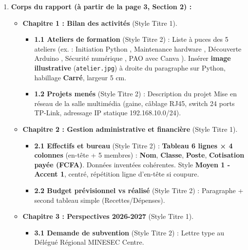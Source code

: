 \documentclass[11pt]{article}
\begin{document}
\begin{exemplebox}
\begin{enumerate}
    \begin{itemize}
        \item Inséré via \texttt{Références > Table des matières > Automatique 1}.
        \item Doit lister les titres de niveau 1 et niveau 2.
        \item Titre \og SOMMAIRE \fg{} mis en forme manuelle (Arial 16, Gras, Centré) pour ne pas apparaître dans la table.
    \end{itemize}
    \item \textbf{Corps du rapport (à partir de la page 3, Section 2) :}
    \begin{itemize}
        \item \textbf{Chapitre 1 : Bilan des activités} (Style Titre 1).
        \begin{itemize}
            \item \textbf{1.1 Ateliers de formation} (Style Titre 2) : Liste à puces des 5 ateliers (ex. : \og Initiation Python \fg{}, \og Maintenance hardware \fg{}, \og Découverte Arduino \fg{}, \og Sécurité numérique \fg{}, \og PAO avec Canva \fg{}). Insérer \textbf{image illustrative} (\texttt{atelier.jpg}) à droite du paragraphe sur Python, habillage \textbf{Carré}, largeur 5 cm.
            \item \textbf{1.2 Projets menés} (Style Titre 2) : Description du projet \og Mise en réseau de la salle multimédia \fg{} (gaine, câblage RJ45, switch 24 ports TP-Link, adressage IP statique 192.168.10.0/24).
        \end{itemize}
        \item \textbf{Chapitre 2 : Gestion administrative et financière} (Style Titre 1).
        \begin{itemize}
            \item \textbf{2.1 Effectifs et bureau} (Style Titre 2) : \textbf{Tableau 6 lignes × 4 colonnes} (en-tête + 5 membres) : \textbf{Nom}, \textbf{Classe}, \textbf{Poste}, \textbf{Cotisation payée (FCFA)}. Données inventées cohérentes. Style \textbf{Moyen 1 - Accent 1}, centré, répétition ligne d'en-tête si coupure.
            \item \textbf{2.2 Budget prévisionnel vs réalisé} (Style Titre 2) : Paragraphe + second tableau simple (Recettes/Dépenses).
        \end{itemize}
        \item \textbf{Chapitre 3 : Perspectives 2026-2027} (Style Titre 1).
        \begin{itemize}
            \item \textbf{3.1 Demande de subvention} (Style Titre 2) : Lettre type au Délégué Régional MINESEC Centre.

\end{itemize}
\end{itemize}
\end{enumerate}
\end{exemplebox}
\end{document}
